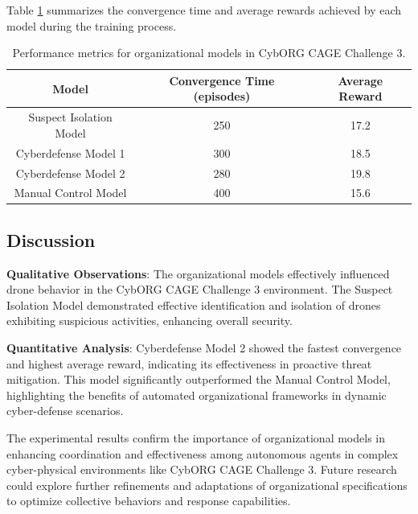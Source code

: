 \documentclass[conference]{IEEEtran}
\begin{document}
Table \ref{tab:results} summarizes the convergence time and average rewards achieved by each model during the training process.

\begin{table}[ht]
    \centering
    \begin{tabular}{|c|c|c|}
        \hline
        Model                   & Convergence Time (episodes) & Average Reward \\
        \hline
        Suspect Isolation Model & 250                         & 17.2           \\
        Cyberdefense Model 1    & 300                         & 18.5           \\
        Cyberdefense Model 2    & 280                         & 19.8           \\
        Manual Control Model    & 400                         & 15.6           \\
        \hline
    \end{tabular}
    \caption{Performance metrics for organizational models in CybORG CAGE Challenge 3.}
    \label{tab:results}
\end{table}

\subsection{Discussion}

\textbf{Qualitative Observations}:
The organizational models effectively influenced drone behavior in the CybORG CAGE Challenge 3 environment. The Suspect Isolation Model demonstrated effective identification and isolation of drones exhibiting suspicious activities, enhancing overall security.

\textbf{Quantitative Analysis}:
Cyberdefense Model 2 showed the fastest convergence and highest average reward, indicating its effectiveness in proactive threat mitigation. This model significantly outperformed the Manual Control Model, highlighting the benefits of automated organizational frameworks in dynamic cyber-defense scenarios.

The experimental results confirm the importance of organizational models in enhancing coordination and effectiveness among autonomous agents in complex cyber-physical environments like CybORG CAGE Challenge 3. Future research could explore further refinements and adaptations of organizational specifications to optimize collective behaviors and response capabilities.
\end{document}
